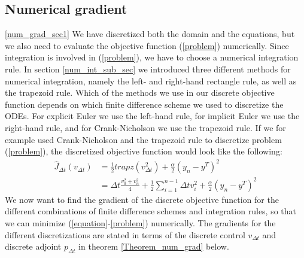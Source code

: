 \subsection{Numerical gradient} \ref{num_grad_sec1}
We have discretized both the domain and the equations, but we also need to evaluate the objective function (\ref{problem}) numerically. Since integration is involved in (\ref{problem}), we have to choose a numerical integration rule. In section \ref{num_int_sub_sec} we introduced three different methods for numerical integration, namely the left- and right-hand rectangle rule, as well as the trapezoid rule. Which of the methods we use in our discrete objective function depends on which finite difference scheme we used to discretize the ODEs. For explicit Euler we use the left-hand rule, for implicit Euler we use the right-hand rule, and for Crank-Nicholson we use the trapezoid rule. If we for example used Crank-Nicholson and the trapezoid rule to discretize problem (\ref{problem}), the discretized objective function would look like the following:
\begin{align}
\hat J_{\Delta t}(v_{\Delta t})&=\frac{1}{2} trapz(v_{\Delta t}^2)+ \frac{\alpha}{2}(y_n-y^T)^2 \\
&=\Delta t\frac{v_0^2+v_n^2}{4} + \frac{1}{2}\sum_{i=1}^{n-1} \Delta t v_i^2 + \frac{\alpha}{2}(y_n-y^T)^2 \label{disc f}
\end{align}
We now want to find the gradient of the discrete objective function for the different combinations of finite difference schemes and integration rules, so that we can minimize (\ref{equation}-\ref{problem}) numerically. The gradients for the different discretizations are stated in terms of the discrete control $v_{\Delta t}$ and discrete adjoint $p_{\Delta t}$ in theorem \ref{Theorem_num_grad} below.
